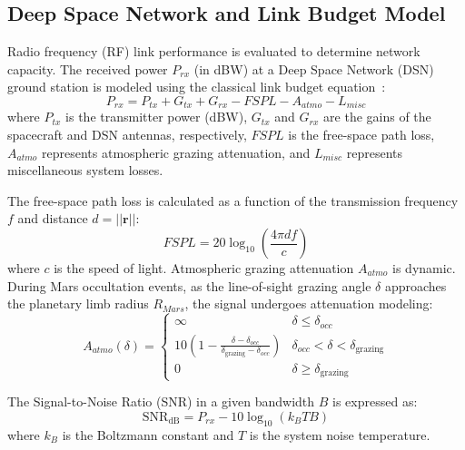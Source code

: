 \documentclass[a4paper,fleqn]{cas-sc}
\begin{document}
\subsection{Deep Space Network and Link Budget Model}
Radio frequency (RF) link performance is evaluated to determine network capacity. The received power $P_{rx}$ (in dBW) at a Deep Space Network (DSN) ground station is modeled using the classical link budget equation~\cite{wertz}:
\begin{equation}
    P_{rx} = P_{tx} + G_{tx} + G_{rx} - FSPL - A_{atmo} - L_{misc}
    \label{eq:link_budget}
\end{equation}
where $P_{tx}$ is the transmitter power (dBW), $G_{tx}$ and $G_{rx}$ are the gains of the spacecraft and DSN antennas, respectively, $FSPL$ is the free-space path loss, $A_{atmo}$ represents atmospheric grazing attenuation, and $L_{misc}$ represents miscellaneous system losses.

The free-space path loss is calculated as a function of the transmission frequency $f$ and distance $d = ||\mathbf{r}||$:
\begin{equation}
    FSPL = 20 \log_{10}\left(\frac{4\pi d f}{c}\right)
    \label{eq:fspl}
\end{equation}
where $c$ is the speed of light. Atmospheric grazing attenuation $A_{atmo}$ is dynamic. During Mars occultation events, as the line-of-sight grazing angle $\delta$ approaches the planetary limb radius $R_{Mars}$, the signal undergoes attenuation modeling:
\begin{equation}
    A_{atmo}(\delta) = \begin{cases} 
      \infty & \delta \le \delta_{occ} \\
      10 \left(1 - \frac{\delta - \delta_{occ}}{\delta_{\text{grazing}} - \delta_{occ}}\right) & \delta_{occ} < \delta < \delta_{\text{grazing}} \\
      0 & \delta \ge \delta_{\text{grazing}}
   \end{cases}
   \label{eq:atmo}
\end{equation}

The Signal-to-Noise Ratio (SNR) in a given bandwidth $B$ is expressed as:
\begin{equation}
    \text{SNR}_{\text{dB}} = P_{rx} - 10\log_{10}(k_B T B)
    \label{eq:snr}
\end{equation}
where $k_B$ is the Boltzmann constant and $T$ is the system noise temperature. 
\end{document}

